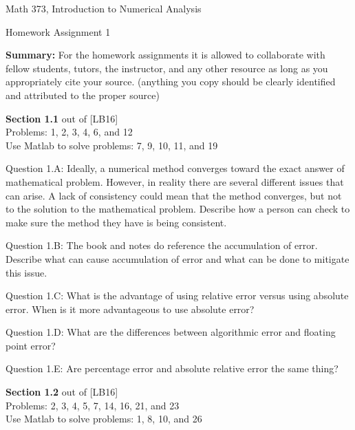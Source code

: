 \documentclass{article}
\renewcommand{\cite}[1]{[#1]}
\begin{document}

\large

{\Large Math 373, Introduction to Numerical Analysis}


{\Large Homework Assignment 1} 

{\bf Summary:} {\color{red} For the homework assignments it is allowed to collaborate with fellow students, tutors, the instructor, and any other resource as long as you appropriately cite your source. (anything you copy should be clearly identified and attributed to the proper source)  } 
\par \bigskip \par \noindent
%

{\bf Section 1.1} out of \cite{LB16} \\
Problems: 1,  2,  3,  4,  6, and 12 \\
Use Matlab to solve problems: 7, 9, 10, 11, and 19 \par \medskip \noindent
%
Question 1.A: Ideally, a numerical method converges toward the exact answer of mathematical problem. However, in reality there are several different issues that can arise. A lack of consistency could mean that the method converges, but not to the solution to the mathematical problem. Describe how a person can check to make sure the method they have is being consistent. \medskip \par \noindent
%
Question 1.B: The book and notes  do reference the accumulation of error. Describe what can cause accumulation of error and what can be done to mitigate this issue. \medskip \par \noindent
%
Question 1.C: What is the advantage of using relative error versus using absolute error. When is it more advantageous to use absolute error?  \medskip \par \noindent
%
Question 1.D: What are the differences between algorithmic error and floating point error?  \medskip \par \noindent
Question 1.E: Are percentage error and absolute relative error the same thing?\par \bigskip \par
{\bf Section 1.2} out of \cite{LB16} \\
Problems: 2, 3, 4, 5, 7, 14, 16, 21, and 23 \\
Use Matlab to solve problems: 1, 8, 10, and 26
\end{document}
